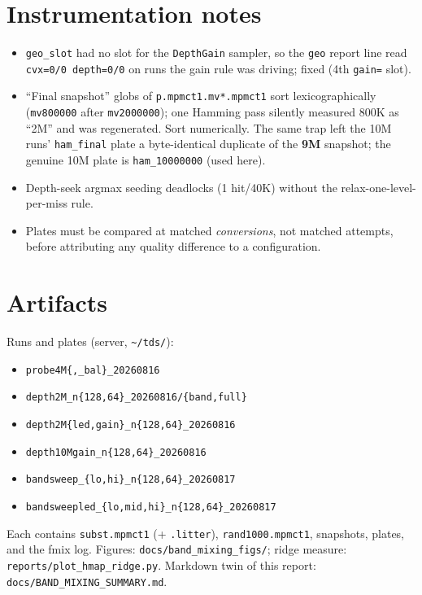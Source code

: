 \documentclass[11pt]{article}
\newcommand{\code}[1]{\texttt{#1}}
\begin{document}
\section{Instrumentation notes}
\begin{itemize}
\item \code{geo\_slot} had no slot for the \code{DepthGain} sampler, so the \code{geo} report line
read \code{cvx=0/0 depth=0/0} on runs the gain rule was driving; fixed (4th \code{gain=} slot).
\item ``Final snapshot'' globs of \code{p.mpmct1.mv*.mpmct1} sort lexicographically
(\code{mv800000} after \code{mv2000000}); one Hamming pass silently measured 800K as ``2M'' and was
regenerated. Sort numerically. The same trap left the 10M runs' \code{ham\_final} plate a
byte-identical duplicate of the \textbf{9M} snapshot; the genuine 10M plate is \code{ham\_10000000}
(used here).
\item Depth-seek argmax seeding deadlocks (1 hit/40K) without the relax-one-level-per-miss rule.
\item Plates must be compared at matched \emph{conversions}, not matched attempts, before attributing
any quality difference to a configuration.
\end{itemize}

\section{Artifacts}
Runs and plates (server, \code{\~{}/tds/}):
\begin{itemize}\setlength\itemsep{0pt}
\item \code{probe4M\{,\_bal\}\_20260816}
\item \code{depth2M\_n\{128,64\}\_20260816/\{band,full\}}
\item \code{depth2M\{led,gain\}\_n\{128,64\}\_20260816}
\item \code{depth10Mgain\_n\{128,64\}\_20260816}
\item \code{bandsweep\_\{lo,hi\}\_n\{128,64\}\_20260817}
\item \code{bandsweepled\_\{lo,mid,hi\}\_n\{128,64\}\_20260817}
\end{itemize}
Each contains \code{subst.mpmct1} (+ \code{.litter}), \code{rand1000.mpmct1}, snapshots, plates, and
the fmix log. Figures: \code{docs/band\_mixing\_figs/}; ridge measure:
\code{reports/plot\_hmap\_ridge.py}. Markdown twin of this report: \code{docs/BAND\_MIXING\_SUMMARY.md}.
\end{document}
